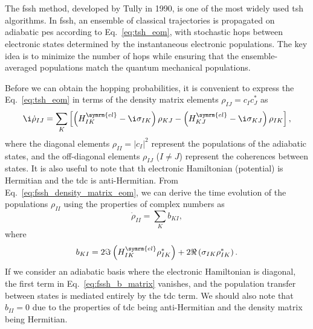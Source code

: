 \section{\filetotitle}\label{sec:fewest_switches}
The \acrfull{fssh} method, developed by Tully in 1990,\supercite{10.1063/1.459170} is one of the most widely used \acrshort{tsh} algorithms. In \acrshort{fssh}, an ensemble of classical trajectories is propagated on adiabatic \acrshort{pes} according to Eq.~\eqref{eq:tsh_eom}, with stochastic hops between electronic states determined by the instantaneous electronic populations. The key idea is to minimize the number of hops while ensuring that the ensemble-averaged populations match the quantum mechanical populations.

Before we can obtain the hopping probabilities, it is convenient to express the Eq.~\eqref{eq:tsh_eom} in terms of the density matrix elements $\rho_{IJ}=c_I c_J^\ast$ as
\begin{equation}\label{eq:fssh_density_matrix_eom}
\i\dot\rho_{IJ}=\sum_K\left[\left(H_{IK}^{\symrm{el}}-\i\sigma_{IK}\right)\rho_{KJ}-\left(H_{KJ}^{\symrm{el}}-\i\sigma_{KJ}\right)\rho_{IK}\right],
\end{equation}
where the diagonal elements $\rho_{II}=\lvert c_I\rvert^2$ represent the populations of the adiabatic states, and the off-diagonal elements $\rho_{IJ}$ ($I\neq J$) represent the coherences between states. It is also useful to note that th electronic Hamiltonian (potential) is Hermitian and the \acrshort{tdc} is anti-Hermitian. From Eq.~\eqref{eq:fssh_density_matrix_eom}, we can derive the time evolution of the populations $\rho_{II}$ using the properties of complex numbers as
\begin{equation}\label{eq:fssh_population_eom}
\dot\rho_{II}=\sum_K b_{KI},
\end{equation}
where
\begin{equation}\label{eq:fssh_b_matrix}
b_{KI}=2\Im\left(H_{IK}^{\symrm{el}}\rho_{IK}^\ast\right)+2\Re\left(\sigma_{IK}\rho_{IK}^\ast\right).
\end{equation}
If we consider an adiabatic basis where the electronic Hamiltonian is diagonal, the first term in Eq.~\eqref{eq:fssh_b_matrix} vanishes, and the population transfer between states is mediated entirely by the \acrshort{tdc} term. We should also note that $b_{II}=0$ due to the properties of \acrshort{tdc} being anti-Hermitian and the density matrix being Hermitian.

